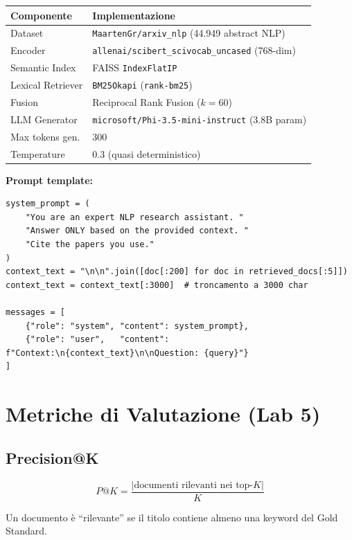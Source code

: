 \documentclass[12pt,a4paper]{article}
\begin{document}
\begin{center}
\begin{tabular}{ll}
\toprule
\textbf{Componente} & \textbf{Implementazione} \\
\midrule
Dataset & \texttt{MaartenGr/arxiv\_nlp} (44.949 abstract NLP) \\
Encoder & \texttt{allenai/scibert\_scivocab\_uncased} (768-dim) \\
Semantic Index & FAISS \texttt{IndexFlatIP} \\
Lexical Retriever & \texttt{BM25Okapi} (\texttt{rank-bm25}) \\
Fusion & Reciprocal Rank Fusion ($k=60$) \\
LLM Generator & \texttt{microsoft/Phi-3.5-mini-instruct} (3.8B param) \\
Max tokens gen. & 300 \\
Temperature & 0.3 (quasi deterministico) \\
\bottomrule
\end{tabular}
\end{center}

\textbf{Prompt template:}
\begin{codebox}
\begin{lstlisting}[style=python]
system_prompt = (
    "You are an expert NLP research assistant. "
    "Answer ONLY based on the provided context. "
    "Cite the papers you use."
)
context_text = "\n\n".join([doc[:200] for doc in retrieved_docs[:5]])
context_text = context_text[:3000]  # troncamento a 3000 char

messages = [
    {"role": "system", "content": system_prompt},
    {"role": "user",   "content": f"Context:\n{context_text}\n\nQuestion: {query}"}
]
\end{lstlisting}
\end{codebox}

\section{Metriche di Valutazione (Lab 5)}

\subsection{Precision@K}\label{sec:metriche-lab5}

\begin{formulabox}
\[
P@K = \frac{|\text{documenti rilevanti nei top-}K|}{K}
\]
\end{formulabox}
Un documento \`e ``rilevante'' se il titolo contiene almeno una keyword del Gold Standard.
\end{document}
